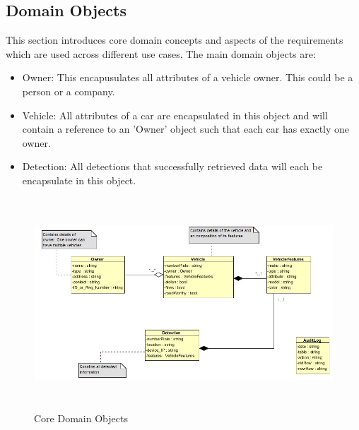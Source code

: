 \documentclass[12pt]{article}
\begin{document}
                    \subsection{Domain Objects}
                    		This section introduces core domain concepts and aspects of the requirements which are used across different use cases.
                    		The main domain objects are:
                    		\begin{itemize}
		                    		\item Owner: This encapusulates all attributes of a vehicle owner. This could be a person or a company.
		                    		\item Vehicle: All attributes of a car are encapsulated in this object and will contain a reference to an 'Owner' object such that each car has exactly one owner.
		                    		\item Detection: All detections that successfully retrieved data will each be encapsulate in this object.
                    		\end{itemize}
                    		\begin{figure}[h]
		                             \centering
		                             \includegraphics[width=6.25in, height=3.11in]{Pictures/CoreDomainObjects.jpg}
		                             \caption{Core Domain Objects}
		             		\end{figure}
             
\end{document}
